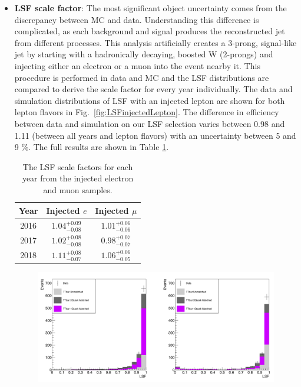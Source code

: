 \begin{itemize}
 \item {\bf LSF scale factor}:
 The most significant object uncertainty comes from the discrepancy between MC and data. Understanding this difference is complicated, as each background and signal produces the reconstructed \NR jet from different processes. This analysis artificially creates a 3-prong, signal-like jet by starting with a hadronically decaying, boosted W (2-prongs) and injecting either an electron or a muon into the event nearby it. This procedure is performed in data and \ttbar MC and the LSF distributions are compared to derive the scale factor for every year individually. The data and simulation distributions of LSF with an injected lepton are shown for both lepton flavors in Fig.~\ref{fig:LSFinjectedLepton}. The difference in efficiency between data and simulation on our LSF selection varies between 0.98 and 1.11 (between all years and lepton flavors) with an uncertainty between 5 and 9 \%. The full results are shown in Table \ref{tab:LSFSF_InjectedSamples}.
 \begin{table}[htbp]
  \caption{
    The LSF scale factors for each year from the injected electron and muon samples.
  }
  \centering
  \label{tab:LSFSF_InjectedSamples}
  \begin{tabular}{ccc}

\hline
Year & Injected $e$ & Injected $\mu$ \\
\hline
2016 & $1.04_{-0.08}^{+0.09}$ & $1.01_{-0.06}^{+0.06}$ \\
2017 & $1.02_{-0.08}^{+0.08}$ & $0.98_{-0.07}^{+0.07}$ \\
2018 & $1.11_{-0.07}^{+0.08}$ & $1.06_{-0.05}^{+0.06}$ \\
\hline
  \end{tabular}
\end{table}

\begin{figure}[!tp]

  \includegraphics[width=\textwidth]{figures/2018_LSF_Injected_Lepton.pdf}


\end{figure}
\end{itemize}
